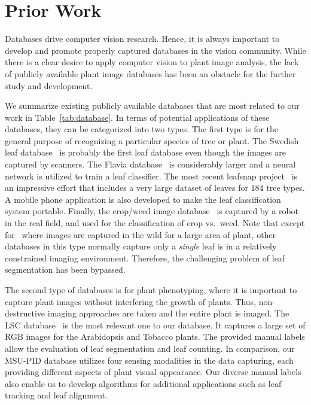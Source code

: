 \section{Prior Work}
\label{sec:prior}

Databases drive computer vision research.
Hence, it is always important to develop and promote properly captured databases in the vision community.
While there is a clear desire to apply computer vision to plant image analysis, the lack of publicly available plant image databases has been an obstacle for the further study and development.

We summarize existing publicly available databases that are most related to our work in Table~\ref{tab:database}.
In terms of potential applications of these databases, they can be categorized into two types.
The first type is for the general purpose of recognizing a particular species of tree or plant.
The Swedish leaf database~\cite{soderkvist2001computer} is probably the first leaf database even though the images are captured by scanners.
The Flavia database~\cite{wu2007leaf} is considerably larger and a neural network is utilized to train a leaf classifier.
The most recent leafsnap project~\cite{kumar2012leafsnap} is an impressive effort that includes a very large dataset of leaves for $184$ tree types.
A mobile phone application is also developed to make the leaf classification system portable.
Finally, the crop/weed image database~\cite{haug2014crop} is captured by a robot in the real field, and used for the classification of crop vs.~weed.
Note that except for~\cite{haug2014crop} where images are captured in the wild for a large area of plant, other databases in this type normally capture only a {\it single} leaf is in a relatively constrained imaging environment.
Therefore, the challenging problem of leaf segmentation has been bypassed.

The second type of databases is for plant phenotyping, where it is important to capture plant images without interfering the growth of plants.
Thus, non-destructive imaging approaches are taken and the entire plant is imaged. The LSC database~\cite{scharr2014annotated} is the most relevant one to our database. 
It captures a large set of RGB images for the Arabidopsis and Tobacco plants. 
The provided manual labels allow the evaluation of leaf segmentation and leaf counting. 
In comparison, our MSU-PID database utilizes four sensing modalities in the data capturing, each providing different aspects of plant visual appearance.
Our diverse manual labels also enable us to develop algorithms for additional applications such as leaf tracking and leaf alignment.

